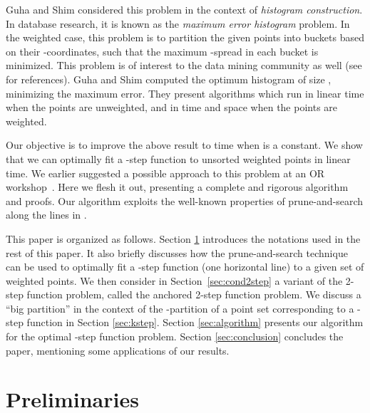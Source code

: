 \documentclass[preprint,10pt]{elsarticle}
\begin{document}
Guha and Shim \cite{guha2007} considered this problem in the context of {\em histogram construction}.
In database research, it is known as the {\em maximum error histogram} problem.
In the weighted case,
 this problem is to partition the given points into  buckets based on their -coordinates,
such that the maximum -spread in each bucket is minimized.
This problem is of interest to the data mining community as well (see \cite{guha2007} for references).
Guha and Shim \cite{guha2007} computed the optimum histogram of size ,
minimizing the maximum error.
They present algorithms which run in linear time when the points are unweighted,
and in  time and  space when the points are weighted.

Our objective is to improve the above result to  time when  is a constant.
We show that we can optimally fit a -step function to unsorted weighted points in linear time.
We earlier suggested a possible approach to this problem at an OR workshop~\cite{bhattacharya2013b}.
Here we flesh it out, presenting a complete and rigorous algorithm and proofs.
Our algorithm exploits the well-known properties of prune-and-search along the lines in \cite{bhattacharya2007}.


This paper is organized as follows.
Section \ref{sec:prelim} introduces the notations used in the rest of this paper.
It also briefly discusses how the prune-and-search technique can be used
to optimally fit a -step function (one horizontal line) to a given set of weighted points.
We then consider in Section~\ref{sec:cond2step} a variant of the 2-step function problem,
called the anchored 2-step function problem.
We discuss a ``big partition'' in the context of the -partition of a point set
corresponding to a -step function in Section \ref{sec:kstep}.
Section \ref{sec:algorithm} presents our algorithm for the optimal -step function problem.
Section \ref{sec:conclusion} concludes the paper,
mentioning some applications of our results.



\section{Preliminaries}\label{sec:prelim}
\end{document}
